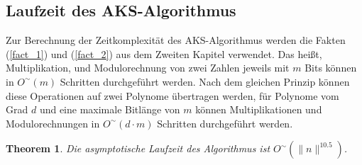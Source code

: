 \documentclass[12pt,oneside]{article}
\newtheorem{theorem}{Theorem}[section]
\theoremstyle{remark}
\theoremstyle{definition}
\begin{document}
\subsection{Laufzeit des AKS-Algorithmus}
Zur Berechnung der Zeitkomplexität des AKS-Algorithmus werden die Fakten (\ref{fact_1}) und (\ref{fact_2}) aus dem Zweiten Kapitel verwendet. Das heißt, Multiplikation, und Modulorechnung von zwei Zahlen jeweils mit $m$ Bits können in $O^{\sim}( m )$ Schritten durchgeführt werden. Nach dem gleichen Prinzip können diese Operationen auf zwei Polynome übertragen werden, für Polynome vom Grad $d$ und eine maximale Bitlänge von  $m$ können Multiplikationen und Modulorechnungen in $O^{\sim}(d \cdot  m )$ Schritten durchgeführt werden.\newline

\begin{theorem}
Die asymptotische Laufzeit des Algorithmus ist $O^{\sim}(\lVert n \rVert^{10.5})$. 
\end{theorem}
\end{document}

